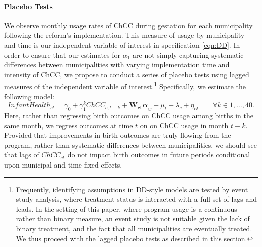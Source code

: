 \documentclass[12pt]{article}
\begin{document}
\begin{spacing}{1.4}
\paragraph{Placebo Tests} We observe monthly usage rates of ChCC
during gestation for each
municipality following the reform's implementation.  This measure
of usage by municipality and time is our independent variable of
interest in specification \ref{eqn:DD}.  In order to ensure that
our estimates for $\alpha_1$ are not simply capturing systematic
differences between municipalities with varying implementation
time and intensity of ChCC, we propose to conduct a series of
placebo tests using lagged measures of the independent variable of
interest.\footnote{Frequently, identifying assumptions in DD-style
  models are tested by event study analysis, where treatment status
  is interacted with a full set of lags and leads.  In the setting
  of this paper, where program usage is a continuous rather than
  binary measure, an event study is not suitable given the lack of
  binary treatment, and the fact that all municipalities are
  eventually treated.  We thus proceed with the lagged placebo
  tests as described in this section.}
Specifically, we estimate the following model:
\begin{equation}
  \label{eqn:placebo}
  Infant Health_{ct} = \gamma_0 + \gamma_1^k ChCC_{c,t-k} + \bm{W_{ct}\alpha}_{w} + \mu_t + \lambda_c + \eta_{ct} \qquad \forall k \in {1,\ldots,40}.
\end{equation}
Here, rather than regressing birth outcomes on ChCC usage among
births in the same month, we regress outcomes at time $t$ on
on ChCC usage in month $t-k$.  Provided
that improvements in birth outcomes are truly flowing from the
program, rather than systematic differences between municipalities,
we should see that lags of $ChCC_{ct}$ do not impact birth outcomes
in future periods conditional upon municipal and time fixed effects.



\end{spacing}
\end{document}
